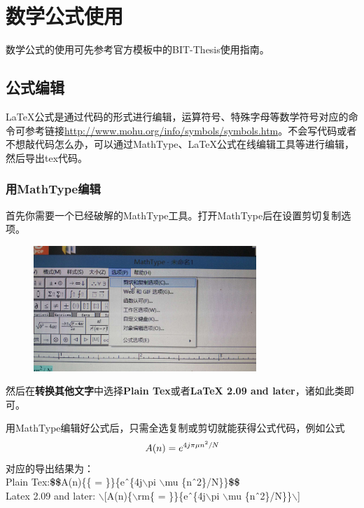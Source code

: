 \chapter{数学公式使用}
数学公式的使用可先参考官方模板中的BIT-Thesis使用指南。
\section{公式编辑}
LaTeX公式是通过代码的形式进行编辑，运算符号、特殊字母等数学符号对应的命令可参考链接\url{http://www.mohu.org/info/symbols/symbols.htm}。不会写代码或者不想敲代码怎么办，可以通过MathType、LaTeX公式在线编辑工具等进行编辑，然后导出tex代码。
\subsection{用MathType编辑}
首先你需要一个已经破解的MathType工具。打开MathType后在设置剪切复制选项。
\begin{figure}[h]
\centering
 \includegraphics[width=0.75\textwidth]{chapters/figures/mathtype_copy_type.jpg}
\end{figure}
然后在\textbf{转换其他文字}中选择\textbf{Plain Tex}或者\textbf{LaTeX 2.09 and later}，诸如此类即可。

用MathType编辑好公式后，只需全选复制或剪切就能获得公式代码，例如公式
\begin{equation}
A(n) = e^{4j\pi \mu n^2/N} \notag
\end{equation}
对应的导出结果为：\\
Plain Tex:\textbf{\$\$}A(n)\{\rm\{ = \}\}\{e\^\ \{4j$\backslash$pi $\backslash$mu \{n\^\ 2\}/N\}\}\textbf{\$\$} \\
Latex 2.09 and later: $\backslash$[A(n)\{$\backslash$rm\{ = \}\}\{e\^\ \{4j$\backslash$pi $\backslash$mu \{n\^\ 2\}/N\}\}$\backslash$]

